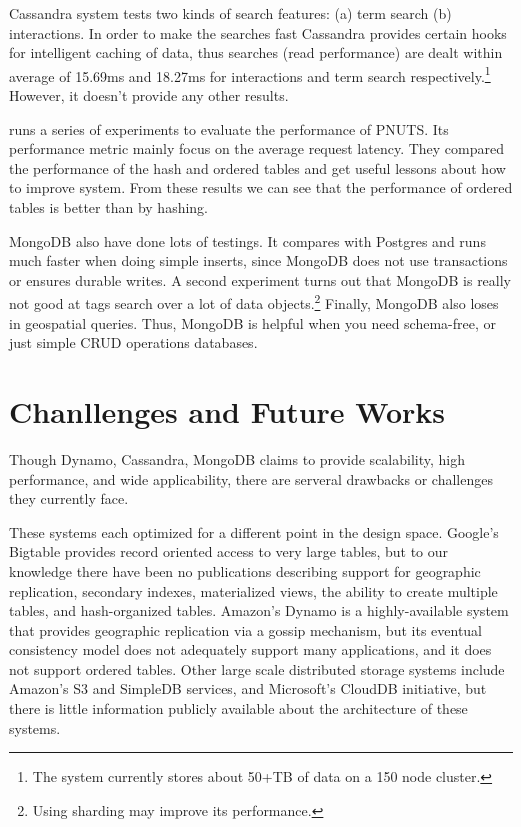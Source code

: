 \documentclass[12pt,letter]{article}
\begin{document}
Cassandra system tests two kinds of search features: (a) term search (b) interactions.\citep{LakshamAvinash2010} In order to make the searches fast Cassandra provides certain hooks for intelligent caching of data, thus searches (read performance) are dealt within average of 15.69ms and 18.27ms for interactions and term search respectively.\footnote{The system currently stores about 50+TB of data on a 150 node cluster.} However, it doesn't provide any other results.

\citep{Silberstein2008} runs a series of experiments to evaluate the performance of PNUTS. Its performance metric mainly focus on the average request latency. They compared the performance of the hash and ordered tables and get useful lessons about how to improve system. From these results we can see that the performance of ordered tables is better than by hashing.

MongoDB also have done lots of testings. It compares with Postgres and runs much faster when doing simple inserts, since MongoDB does not use transactions or ensures durable writes. A second experiment turns out that MongoDB is really not good at tags search over a lot of data objects.\footnote{Using sharding may improve its performance.} Finally, MongoDB also loses in geospatial queries. Thus, MongoDB is helpful when you need schema-free, or just simple CRUD operations databases.

\section{Chanllenges and Future Works}
Though Dynamo, Cassandra, MongoDB claims to provide scalability, high performance, and wide applicability, there are serveral drawbacks or challenges they currently face.

These systems each optimized for a different point in the design space. Google's Bigtable provides record oriented access to very large tables, but to our knowledge there have been no publications describing support for geographic replication, secondary indexes, materialized views, the ability to create multiple tables, and hash-organized tables. Amazon's Dynamo is a highly-available system that provides geographic replication via a gossip mechanism, but its eventual consistency model does not adequately support many applications, and it does not support ordered tables. Other large scale distributed storage systems include Amazon's S3 and SimpleDB services, and Microsoft’s CloudDB initiative, but there is little information publicly available about the architecture of these systems.
\end{document}
